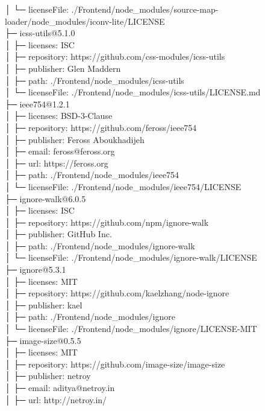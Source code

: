 │  └─ licenseFile: ./Frontend/node\_modules/source-map-loader/node\_modules/iconv-lite/LICENSE\\
├─ icss-utils@5.1.0\\
│  ├─ licenses: ISC\\
│  ├─ repository: https://github.com/css-modules/icss-utils\\
│  ├─ publisher: Glen Maddern\\
│  ├─ path: ./Frontend/node\_modules/icss-utils\\
│  └─ licenseFile: ./Frontend/node\_modules/icss-utils/LICENSE.md\\
├─ ieee754@1.2.1\\
│  ├─ licenses: BSD-3-Clause\\
│  ├─ repository: https://github.com/feross/ieee754\\
│  ├─ publisher: Feross Aboukhadijeh\\
│  ├─ email: feross@feross.org\\
│  ├─ url: https://feross.org\\
│  ├─ path: ./Frontend/node\_modules/ieee754\\
│  └─ licenseFile: ./Frontend/node\_modules/ieee754/LICENSE\\
├─ ignore-walk@6.0.5\\
│  ├─ licenses: ISC\\
│  ├─ repository: https://github.com/npm/ignore-walk\\
│  ├─ publisher: GitHub Inc.\\
│  ├─ path: ./Frontend/node\_modules/ignore-walk\\
│  └─ licenseFile: ./Frontend/node\_modules/ignore-walk/LICENSE\\
├─ ignore@5.3.1\\
│  ├─ licenses: MIT\\
│  ├─ repository: https://github.com/kaelzhang/node-ignore\\
│  ├─ publisher: kael\\
│  ├─ path: ./Frontend/node\_modules/ignore\\
│  └─ licenseFile: ./Frontend/node\_modules/ignore/LICENSE-MIT\\
├─ image-size@0.5.5\\
│  ├─ licenses: MIT\\
│  ├─ repository: https://github.com/image-size/image-size\\
│  ├─ publisher: netroy\\
│  ├─ email: aditya@netroy.in\\
│  ├─ url: http://netroy.in/\\
